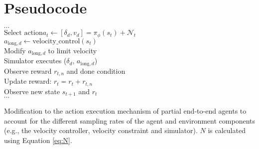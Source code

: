 \chapter{Pseudocode}\label{appendix_B}

\begin{algorithm}[htb!]
{
        $\cdots$\\
        $\text{Select action} a_t \leftarrow [\delta_{d}, v_{d}] = \pi_{\phi}(s_t) + \mathcal{N}_t$ \\
        {   
            $a_{\text{long},d} \leftarrow \text{velocity_control}(s_t)$ \\
            Modify $a_{\text{long},d}$ to limit velocity \\
            Simulator executes ($\delta_d$, $a_{\text{long},d}$) \\
            Observe reward $r_{t,n}$ and done condition \\  
            Update reward: $r_t = r_t + r_{t,n}$ \\
        }
        Observe new state $s_{t+1}$ and $r_t$ \\
        $\cdots$\\
}
\caption[Modification to the action execution mechanism for partial end-to-end agents with a velocity controller]{Modification to the action execution mechanism of partial end-to-end agents to account for the different sampling rates of the agent and environment components (e.g., the velocity controller, velocity constraint and simulator). $N$ is calculated using Equation \ref{eq:N}.}
\label{alg:velocity_sample_rate_modification}
\end{algorithm}


